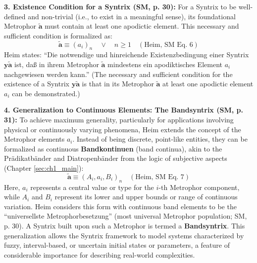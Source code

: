 \documentclass[
    12pt,              %
    a4paper,           %
    headings=normal,   %
    twoside=true,      %
    BCOR=8mm,          %
]{scrbook}
\newcommand{\q}[1]{\enquote{#1}}
\newcommand{\syntrix}{\bm{y\widetilde{a}}}
\newcommand{\metrophor}{\bm{\widetilde{a}}}
\begin{document}
\textbf{3. Existence Condition for a Syntrix (SM, p. 30):}
For a Syntrix to be well-defined and non-trivial (i.e., to exist in a meaningful sense), its foundational Metrophor \(\metrophor\) must contain at least one apodictic element. This necessary and sufficient condition is formalized as:
\begin{equation} \label{eq:original_syntrix_existence_condition} 
\metrophor \equiv (a_i)_n \quad \lor \quad n \geq 1 \quad (\text{Heim, SM Eq. 6})
\end{equation}
Heim states: \q{Die notwendige und hinreichende Existenzbedingung einer Syntrix \(\syntrix\) ist, daß in ihrem Metrophor \(\metrophor\) mindestens ein apodiktisches Element \(a_i\) nachgewiesen werden kann.} (The necessary and sufficient condition for the existence of a Syntrix \(\syntrix\) is that in its Metrophor \(\metrophor\) at least one apodictic element \(a_i\) can be demonstrated.)

\textbf{4. Generalization to Continuous Elements: The Bandsyntrix (SM, p. 31):}
To achieve maximum generality, particularly for applications involving physical or continuously varying phenomena, Heim extends the concept of the Metrophor elements \(a_i\). Instead of being discrete, point-like entities, they can be formalized as continuous \textbf{Bandkontinuen} (band continua), akin to the Prädikatbänder and Diatropenbänder from the logic of subjective aspects (Chapter \ref{sec:ch1_main}):
\begin{equation} \label{eq:original_bandsyntrix} 
\metrophor \equiv (A_i, a_i, B_i)_n \quad (\text{Heim, SM Eq. 7})
\end{equation}
Here, \(a_i\) represents a central value or type for the \(i\)-th Metrophor component, while \(A_i\) and \(B_i\) represent its lower and upper bounds or range of continuous variation. Heim considers this form with continuous band elements to be the \q{universellste Metrophorbesetzung} (most universal Metrophor population; SM, p. 30). A Syntrix built upon such a Metrophor is termed a \textbf{Bandsyntrix}. This generalization allows the Syntrix framework to model systems characterized by fuzzy, interval-based, or uncertain initial states or parameters, a feature of considerable importance for describing real-world complexities.
\end{document}
